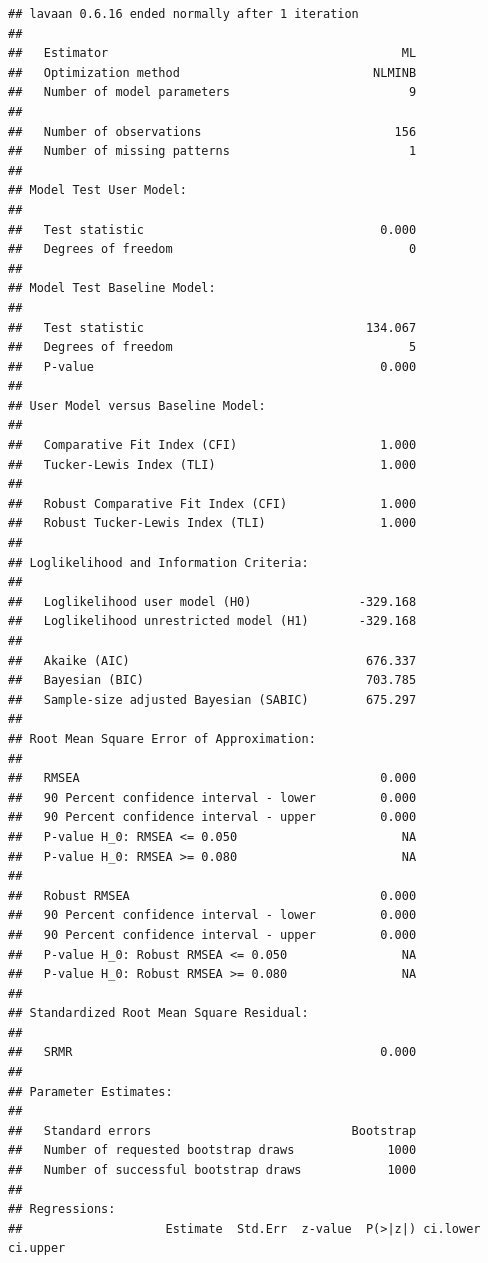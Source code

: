 \documentclass[
  11pt,
]{book}
\begin{document}
\begin{verbatim}
## lavaan 0.6.16 ended normally after 1 iteration
## 
##   Estimator                                         ML
##   Optimization method                           NLMINB
##   Number of model parameters                         9
## 
##   Number of observations                           156
##   Number of missing patterns                         1
## 
## Model Test User Model:
##                                                       
##   Test statistic                                 0.000
##   Degrees of freedom                                 0
## 
## Model Test Baseline Model:
## 
##   Test statistic                               134.067
##   Degrees of freedom                                 5
##   P-value                                        0.000
## 
## User Model versus Baseline Model:
## 
##   Comparative Fit Index (CFI)                    1.000
##   Tucker-Lewis Index (TLI)                       1.000
##                                                       
##   Robust Comparative Fit Index (CFI)             1.000
##   Robust Tucker-Lewis Index (TLI)                1.000
## 
## Loglikelihood and Information Criteria:
## 
##   Loglikelihood user model (H0)               -329.168
##   Loglikelihood unrestricted model (H1)       -329.168
##                                                       
##   Akaike (AIC)                                 676.337
##   Bayesian (BIC)                               703.785
##   Sample-size adjusted Bayesian (SABIC)        675.297
## 
## Root Mean Square Error of Approximation:
## 
##   RMSEA                                          0.000
##   90 Percent confidence interval - lower         0.000
##   90 Percent confidence interval - upper         0.000
##   P-value H_0: RMSEA <= 0.050                       NA
##   P-value H_0: RMSEA >= 0.080                       NA
##                                                       
##   Robust RMSEA                                   0.000
##   90 Percent confidence interval - lower         0.000
##   90 Percent confidence interval - upper         0.000
##   P-value H_0: Robust RMSEA <= 0.050                NA
##   P-value H_0: Robust RMSEA >= 0.080                NA
## 
## Standardized Root Mean Square Residual:
## 
##   SRMR                                           0.000
## 
## Parameter Estimates:
## 
##   Standard errors                            Bootstrap
##   Number of requested bootstrap draws             1000
##   Number of successful bootstrap draws            1000
## 
## Regressions:
##                    Estimate  Std.Err  z-value  P(>|z|) ci.lower ci.upper

\end{verbatim}
\end{document}
